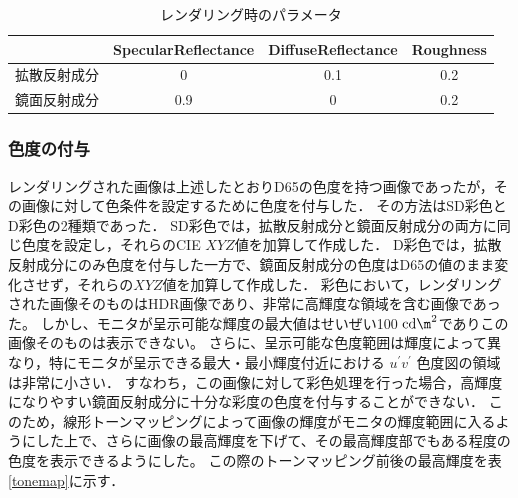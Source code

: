                 \begin{table}[h]
                    \centering
                    \caption{レンダリング時のパラメータ}
                    \begin{tabular}{|l||c|c|c|} \hline
                                               & SpecularReflectance & DiffuseReflectance & Roughness \\ \hline \hline
                        拡散反射成分           & 0                   & 0.1                & 0.2 \\ \hline
                        鏡面反射成分           & 0.9                 & 0                  & 0.2 \\ \hline
                    \end{tabular}
                    \label{render_param}
                \end{table}
            
            \subsubsection{色度の付与}

                レンダリングされた画像は上述したとおりD65の色度を持つ画像であったが，その画像に対して色条件を設定するために色度を付与した．
                その方法はSD彩色とD彩色の2種類であった．
                SD彩色では，拡散反射成分と鏡面反射成分の両方に同じ色度を設定し，それらのCIE $XYZ$値を加算して作成した．
                D彩色では，拡散反射成分にのみ色度を付与した一方で、鏡面反射成分の色度はD65の値のまま変化させず，それらの$XYZ$値を加算して作成した．
                彩色において，レンダリングされた画像そのものはHDR画像であり、非常に高輝度な領域を含む画像であった。
                しかし、モニタが呈示可能な輝度の最大値はせいぜい100 ${\rm cd\m}^2$でありこの画像そのものは表示できない。
                さらに、呈示可能な色度範囲は輝度によって異なり，特にモニタが呈示できる最大・最小輝度付近における $u^{\prime}v^{\prime}$ 色度図の領域は非常に小さい．
                すなわち，この画像に対して彩色処理を行った場合，高輝度になりやすい鏡面反射成分に十分な彩度の色度を付与することができない．
                このため，線形トーンマッピングによって画像の輝度がモニタの輝度範囲に入るようにした上で、さらに画像の最高輝度を下げて、その最高輝度部でもある程度の色度を表示できるようにした。
                この際のトーンマッピング前後の最高輝度を表\ref{tonemap}に示す．


